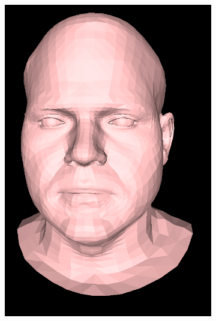 \begin{figure}[h]
    \centering
    \begin{subfigure}[b]{0.4\textwidth}
        \includegraphics[width=\textwidth]{figures/subject2_unaligned.png}
    \end{subfigure}
    \begin{subfigure}[b]{0.4\textwidth}

\end{subfigure}
\end{figure}
